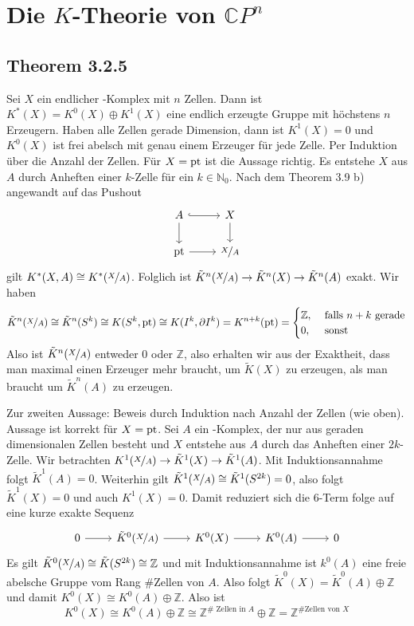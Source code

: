 \section*{Die $K$-Theorie von $\mathds{C}P^n$}

\subsection*{Theorem 3.2.5} %
\label{sub:theorem}
Sei $X$ ein endlicher \CW-Komplex mit $n$ Zellen. Dann ist $K^*(X) = K^0(X) \oplus K^1(X)$ eine endlich erzeugte Gruppe mit höchstens $n$ Erzeugern. Haben alle Zellen gerade
Dimension, dann ist $K^1(X)=0$ und $K^0(X)$ ist frei abelsch mit genau einem Erzeuger für jede Zelle.
Per Induktion über die Anzahl der Zellen. Für $X=\pt$ ist die Aussage richtig. Es entstehe $X$ aus $A$ durch Anheften einer $k$-Zelle für ein $k \in \mathds{N}_0$. Nach dem
Theorem 3.9 b) angewandt auf das Pushout
\[
	\begin{tikzcd}
		A \rar[hook] \dar & X \dar\\
		\pt \rar & \nicefrac{X}{A}
	\end{tikzcd}
\]
gilt $K^*(X,A) \cong K^*(\nicefrac{X}{A})$. Folglich ist $\tilde{K}^n(\nicefrac{X}{A}) \to \tilde{K}^n(X) \to \tilde{K}^n(A)$ exakt. Wir haben 
\[
	\tilde{K}^n(\nicefrac{X}{A}) \cong \tilde{K}^n(S^k) \cong K(S^k,\pt) \cong K(I^k,\partial I^k) = K^{n+k}(\pt) = \begin{cases}
		\mathds{Z}, &\text{ falls }n+k \text{ gerade}\\
		0 ,&\text{ sonst}
	\end{cases}
\]
Also ist $\tilde{K}^n(\nicefrac{X}{A})$ entweder $0$ oder $\mathds{Z}$, also erhalten wir aus der Exaktheit, dass man maximal einen Erzeuger mehr braucht, um $\tilde{K}(X)$
zu erzeugen, als man braucht um $\tilde{K}^n(A)$ zu erzeugen.

Zur zweiten Aussage: Beweis durch Induktion nach Anzahl der Zellen (wie oben). Aussage ist korrekt für $X=\pt$. Sei $A$ ein \CW-Komplex, der nur aus geraden dimensionalen 
Zellen besteht und $X$ entstehe aus $A$ durch das Anheften einer $2k$-Zelle. Wir betrachten $K^1(\nicefrac{X}{A}) \to \tilde{K}^1(X) \to \tilde{K}^1(A)$. Mit 
Induktionsannahme folgt $\tilde{K}^1(A)=0$. Weiterhin gilt $\tilde{K}^1(\nicefrac{X}{A}) \cong \tilde{K}^1(S^{2k})=0$, also folgt $\tilde{K}^1(X)=0$ und auch $K^1(X)=0$.
Damit reduziert sich die 6-Term folge auf eine kurze exakte Sequenz
\[
	\begin{tikzcd}
		0 \rar & \tilde{K}^0(\nicefrac{X}{A}) \rar & K^0(X) \rar & K^0(A) \rar & 0
	\end{tikzcd}
\]
Es gilt $\tilde{K}^0(\nicefrac{X}{A}) \cong \tilde{K}(S^{2k}) \cong \mathds{Z}$ und mit Induktionsannahme ist $k^0(A)$ eine freie abelsche Gruppe vom Rang 
$\# \text{Zellen von $A$}$. Also folgt $\tilde{K}^0(X) = \tilde{K}^0(A) \oplus \mathds{Z}$ und damit $K^0(X)\cong K^0(A) \oplus \mathds{Z}$. Also ist 
\[
	K^0(X) \cong K^0(A) \oplus \mathds{Z} \cong \mathds{Z}^{\#\text{ Zellen in $A$}} \oplus \mathds{Z} = \mathds{Z}^{\#\text{Zellen von $X$}}
\]

